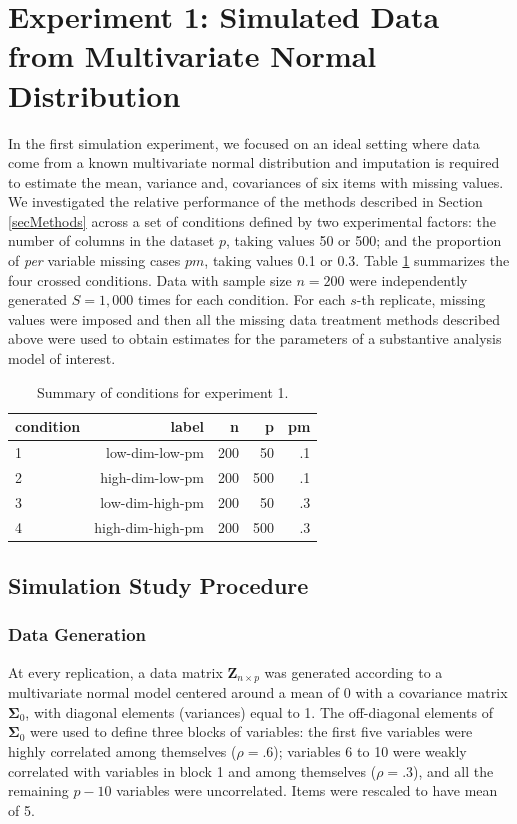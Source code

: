 \section{Experiment 1: Simulated Data from Multivariate Normal Distribution}

	In the first simulation experiment, we focused on an ideal setting where data come from a known multivariate normal 
	distribution and imputation is required to estimate the mean, variance and, covariances of six items with missing values.
	We investigated the relative performance of the methods described in Section \ref{secMethods} across a set of conditions 
	defined by two experimental factors: the number of columns in the dataset $p$, taking values 50 or 500; 
	and the proportion of \emph{per} variable missing cases $pm$, taking values 0.1 or 0.3.
	Table \ref{tab:condExp1} summarizes the four crossed conditions.
	Data with sample size $n=200$ were independently generated $S = 1,000$ times for each condition.
	For each $s$-th replicate, missing values were imposed and then all the missing data treatment methods described above
	were used to obtain estimates for the parameters of a substantive analysis model of interest.

\begin{table}
	\centering
	\begin{tabular}{l | r | r | r | r }
		condition & label & n & p & pm \\
		\hline
		1 & low-dim-low-pm   & 200 & 50  & .1 \\
		2 & high-dim-low-pm  & 200 & 500 & .1 \\
		3 & low-dim-high-pm  & 200 & 50  & .3 \\
		4 & high-dim-high-pm & 200 & 500 & .3 \\
	\end{tabular}
	\caption{\label{tab:condExp1}Summary of conditions for experiment 1.}
\end{table}


\subsection{Simulation Study Procedure}

\subsubsection{Data Generation}
	At every replication, a data matrix $\bm{Z}_{n \times p}$ was generated according to a multivariate normal model 
	centered around a mean of 0 with a covariance matrix $\bm{\Sigma}_0$, with diagonal elements (variances) equal to 1.
	The off-diagonal elements of $\bm{\Sigma}_0$ were used to define three blocks of variables: 
	the first five variables were highly correlated among themselves ($\rho = .6$);
	variables 6 to 10 were weakly correlated with variables in block 1 and among themselves ($\rho = .3$), 
	and all the remaining $p-10$ variables were uncorrelated.
	Items were rescaled to have mean of 5.

